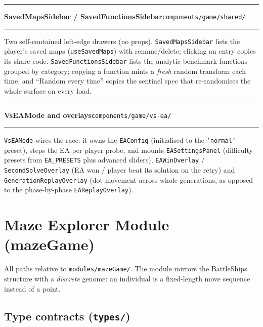 \documentclass[11pt,a4paper]{report}
\newcommand{\srcfile}[1]{\texttt{\small #1}}   %
\newcommand{\ts}[1]{\texttt{#1}}               %
\newenvironment{apientry}[2]{%
  \par\medskip\noindent
  \begin{minipage}{\textwidth}
  \hrule\vspace{0.6ex}
  {\large\ttfamily\bfseries #1}\hfill{\footnotesize\srcfile{#2}}
  \vspace{0.4ex}\hrule\medskip
}{%
  \end{minipage}\par\medskip
}
\begin{document}
\begin{apientry}{SavedMapsSidebar / SavedFunctionsSidebar}{components/game/shared/}
Two self-contained left-edge drawers (no props).
\ts{SavedMapsSidebar} lists the player's saved maps (\ts{useSavedMaps})
with rename/delete; clicking an entry copies its share code.
\ts{SavedFunctionsSidebar} lists the analytic benchmark functions grouped
by category; copying a function mints a \emph{fresh} random transform
each time, and ``Random every time'' copies the sentinel spec that
re-randomises the whole surface on every load.
\end{apientry}

\begin{apientry}{VsEAMode and overlays}{components/game/vs-ea/}
\ts{VsEAMode} wires the race: it owns the \ts{EAConfig} (initialised to
the \ts{'normal'} preset), steps the EA per player probe, and mounts
\ts{EASettingsPanel} (difficulty presets from \ts{EA\_PRESETS} plus
advanced sliders), \ts{EAWinOverlay} / \ts{SecondSolveOverlay} (EA won /
player beat its solution on the retry) and
\ts{GenerationReplayOverlay} (dot movement across whole generations, as
opposed to the phase-by-phase \ts{EAReplayOverlay}).
\end{apientry}

\chapter{Maze Explorer Module (mazeGame)}
\label{ch:api-maze}

All paths relative to \srcfile{modules/mazeGame/}. The module mirrors the
BattleShips structure with a \emph{discrete} genome: an individual is a
fixed-length move sequence instead of a point.

\section{Type contracts (\srcfile{types/})}
\end{document}
